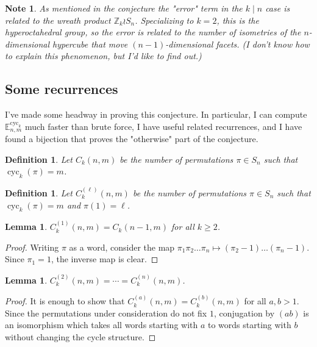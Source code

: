 \documentclass{article}
\numberwithin{equation}{subsection}
\newtheorem{definition}[theo]{Definition}
\newtheorem{lemma}[theo]{Lemma}
\newtheorem{note}[theo]{Note}
\begin{document}
\begin{note}
  As mentioned in the conjecture the "error" term in the $k \mid n$ case is
  related to the wreath product $\mathbb Z_k \wr S_n$.
  Specializing to $k = 2$, this is the hyperoctahedral group,
  so the error is related to the number of isometries of the $n$-dimensional
  hypercube that move $(n-1)$-dimensional facets.
  (I don't know how to explain this phenomenon, but I'd like to find out.)
\end{note}
\subsection{Some recurrences}
I've made some headway in proving this conjecture. In particular, I can
compute $\mathbb{E}_{n,m}^{\text{cyc}_k}$ much faster than brute force,
I have useful related recurrences, and
I have found a bijection that proves the "otherwise"
part of the conjecture.
\begin{definition}
  Let $C_k(n,m)$ be the number of permutations $\pi \in S_n$ such that
  $\operatorname{cyc}_k(\pi) = m$.
\end{definition}
\begin{definition}
  Let $C^{(\ell)}_k(n,m)$ be the number of permutations $\pi \in S_n$ such that
  $\operatorname{cyc}_k(\pi) = m$ and $\pi(1) = \ell$.
\end{definition}
\begin{lemma}
  $C_k^{(1)}(n,m) = C_k(n-1, m)$ for all $k \geq 2$.
\end{lemma}
\begin{proof}
  Writing $\pi$ as a word, consider the map
  $\pi_1\pi_2\dots\pi_n \mapsto (\pi_2 - 1)\dots(\pi_n - 1)$. Since
  $\pi_1 = 1$, the inverse map is clear.
\end{proof}
\begin{lemma}
  $C_k^{(2)}(n,m) = \cdots = C_k^{(n)}(n,m)$.
\end{lemma}
\begin{proof}
  It is enough to show that $C_k^{(a)}(n,m) = C_k^{(b)}(n,m)$ for all
  $a, b > 1$. Since the permutations under consideration do not fix $1$,
  conjugation by $(ab)$ is an isomorphism which takes all words starting
  with $a$ to words starting with $b$ without changing the cycle structure.
\end{proof}
\end{document}
